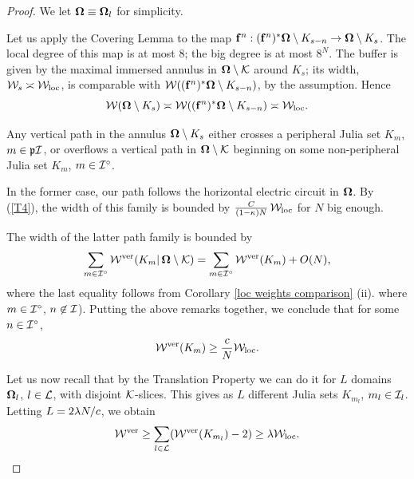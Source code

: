 \begin{proof}
We let ${\boldsymbol{{\Omega}}}\equiv {\boldsymbol{{\Omega}}}_l$ %
for simplicity. 

  Let us apply the Covering Lemma to  the map ${\mathbf{f}}^n: ({\mathbf{f}}^n)^* {\boldsymbol{{\Omega}}} \setminus K_{s-n}\rightarrow {\boldsymbol{{\Omega}}}\setminus K_s$.
The local degree of this map is at most $8$; the big degree is at most $8^N$. The buffer is given by the maximal immersed annulus
in ${\boldsymbol{{\Omega}}}\setminus {\mathcal K}$ around $K_s$; its width, ${\mathcal W}_s \asymp  {\mathcal W}_{\mathrm{loc}}$, is comparable with ${\mathcal W} (({\mathbf{f}}^n)^* {\boldsymbol{{\Omega}}} \setminus K_{s-n})$, by the assumption. 
Hence
$$
      {\mathcal W}({\boldsymbol{{\Omega}}}\setminus K_s) \asymp {\mathcal W}(({\mathbf{f}}^n)^*{\boldsymbol{{\Omega}}}\setminus K_{s-n} ) \asymp {\mathcal W}_{\mathrm{loc}}. 
$$    


Any vertical path in
the annulus ${\boldsymbol{{\Omega}}}\setminus K_s$ either crosses  a peripheral
Julia set $K_m$,  $m\in {\mathfrak{p}} {\mathcal I}$, 
or  overflows a vertical path in ${\boldsymbol{{\Omega}}}\setminus{\mathcal K}$ beginning on some  non-peripheral Julia set $K_m$, $m\in {\mathcal I}^\circ$. 

In the former case, our path follows the horizontal  electric circuit
in ${\boldsymbol{{\Omega}}}$. By  (\ref{T4}),       %
the width of this
family is bounded by $\frac C {(1-\kappa) N}\, {\mathcal W}_{\mathrm{loc}}$ for $N$ big enough.  %

The width of the latter  path family is bounded by 
$$
  \sum_{m\in \II^\circ} \WW^\ver (K_m|\, \BOM\sm \KK)  %
                        = \sum_{m\in \II^\circ} \WW^\ver (K_m) +O(N),  
$$
where the last equality follows from  Corollary \ref{loc weights comparison} (ii).
where   $m\in {\mathcal I}^\circ$, $n\not\in  {\mathcal I}$).
Putting the above remarks together, we conclude that for some $n\in {\mathcal I}^\circ$, 
$$
   {\mathcal W}^{\mathrm {ver}} (K_m) \geq \frac c {N} {\mathcal W}_{\mathrm{loc}}.
$$

Let us now recall that by the Translation Property we can do it for $L$ domains ${\boldsymbol{{\Omega}}}_l$, $l\in {\mathcal L}$, with disjoint ${\mathcal K}$-slices. 
This gives as $L$  different Julia sets $K_{m_l}$,  $m_l\in {\mathcal I}_l $. Letting $L= 2{\lambda} N/c $,
we obtain
$$  
   {\mathcal W}^{\mathrm {ver}}\geq \sum_{l\in {\mathcal L}}  ({\mathcal W}^{\mathrm {ver}} (K_{m_l})- 2) \geq   {\lambda} {\mathcal W}_{\mathrm{loc}}. 
$$
\end{proof}



